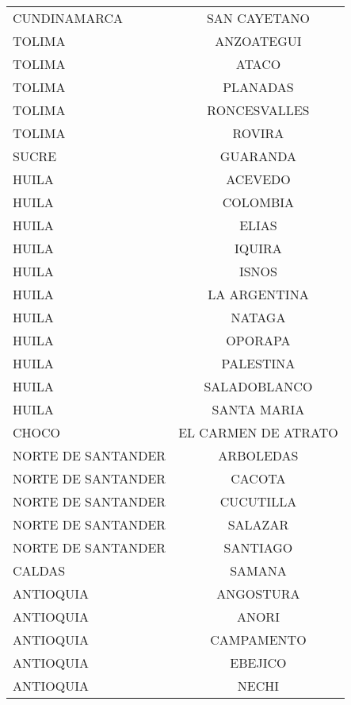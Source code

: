 \documentclass[12pt,a4paper]{article}
\begin{document}
\begin{longtable}{@{}lc@{}}
		CUNDINAMARCA       & SAN CAYETANO          \\
		TOLIMA             & ANZOATEGUI            \\
		TOLIMA             & ATACO                 \\
		TOLIMA             & PLANADAS              \\
		TOLIMA             & RONCESVALLES          \\
		TOLIMA             & ROVIRA                \\
		SUCRE              & GUARANDA              \\
		HUILA              & ACEVEDO               \\
		HUILA              & COLOMBIA              \\
		HUILA              & ELIAS                 \\
		HUILA              & IQUIRA                \\
		HUILA              & ISNOS                 \\
		HUILA              & LA ARGENTINA          \\
		HUILA              & NATAGA                \\
		HUILA              & OPORAPA               \\
		HUILA              & PALESTINA             \\
		HUILA              & SALADOBLANCO          \\
		HUILA              & SANTA MARIA           \\
		CHOCO              & EL CARMEN DE ATRATO   \\
		NORTE DE SANTANDER & ARBOLEDAS             \\
		NORTE DE SANTANDER & CACOTA                \\
		NORTE DE SANTANDER & CUCUTILLA             \\
		NORTE DE SANTANDER & SALAZAR               \\
		NORTE DE SANTANDER & SANTIAGO              \\
		CALDAS             & SAMANA                \\
		ANTIOQUIA          & ANGOSTURA             \\
		ANTIOQUIA          & ANORI                 \\
		ANTIOQUIA          & CAMPAMENTO            \\
		ANTIOQUIA          & EBEJICO               \\
		ANTIOQUIA          & NECHI                 \\

\end{longtable}
\end{document}
